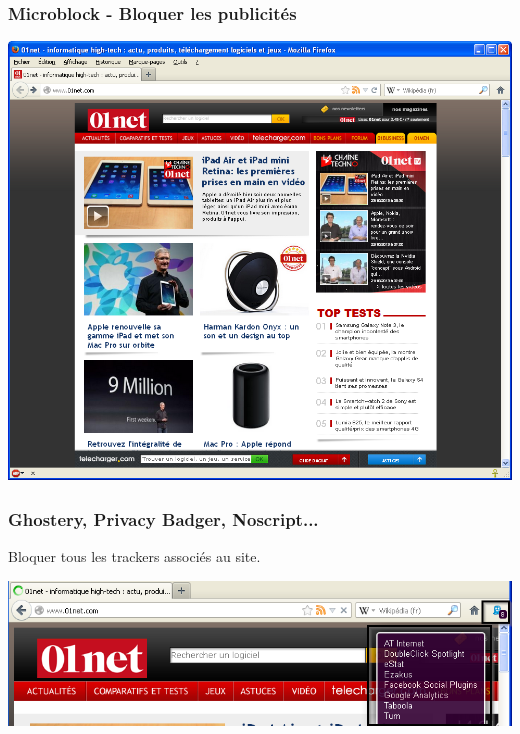 \documentclass{beamer}
\begin{document}
\begin{frame}
\frametitle{Microblock - Bloquer les publicités}
\begin{center}
\includegraphics[scale=0.4] {./images/Adblock02.png}
\end{center}
\end{frame}

\begin{frame}
\frametitle{Ghostery, Privacy Badger, Noscript...}
Bloquer tous les trackers associés au site.
\begin{center}
\includegraphics[scale=0.4] {./images/Ghostery_tracker.png}
\end{center}
\end{frame}
\end{document}

